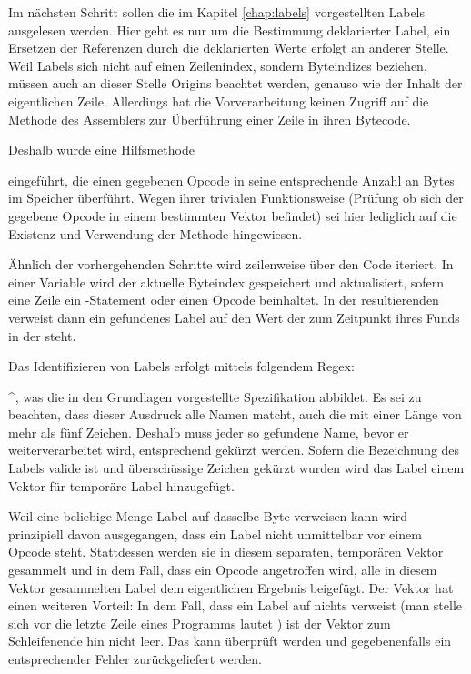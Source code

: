Im nächsten Schritt sollen die im Kapitel \ref{chap:labels} vorgestellten Labels ausgelesen werden. Hier geht es nur um die Bestimmung deklarierter Label, ein Ersetzen der Referenzen durch die deklarierten Werte erfolgt an anderer Stelle. Weil Labels sich nicht auf einen Zeilenindex, sondern Byteindizes beziehen, müssen auch an dieser Stelle Origins beachtet werden, genauso wie der Inhalt der eigentlichen Zeile. Allerdings hat die Vorverarbeitung keinen Zugriff auf die Methode  des Assemblers zur Überführung einer Zeile in ihren Bytecode. 

Deshalb wurde eine Hilfsmethode

 eingeführt, die einen gegebenen Opcode in seine entsprechende Anzahl an Bytes im Speicher überführt. Wegen ihrer trivialen Funktionsweise (Prüfung ob sich der gegebene Opcode in einem bestimmten Vektor befindet) sei hier lediglich auf die Existenz und Verwendung der Methode hingewiesen. 

Ähnlich der vorhergehenden Schritte wird zeilenweise über den Code iteriert. In einer Variable  wird der aktuelle Byteindex gespeichert und aktualisiert, sofern eine Zeile ein -Statement oder einen Opcode beinhaltet. In der resultierenden  verweist dann ein gefundenes Label auf den Wert der zum Zeitpunkt ihres Funds in der  steht.

Das Identifizieren von Labels erfolgt mittels folgendem Regex:

\textasciicircum\regex{( *[a-zA-Z@?][a-zA-Z@?0-9]*:)}, was die in den Grundlagen vorgestellte Spezifikation abbildet. Es sei zu beachten, dass dieser Ausdruck alle Namen matcht, auch die mit einer Länge von mehr als fünf Zeichen. Deshalb muss jeder so gefundene Name, bevor er weiterverarbeitet wird, entsprechend gekürzt werden. Sofern die Bezeichnung des Labels valide ist und überschüssige Zeichen gekürzt wurden wird das Label einem Vektor für \glqq temporäre\grqq{} Label hinzugefügt.

Weil eine beliebige Menge Label auf dasselbe Byte verweisen kann wird prinzipiell davon ausgegangen, dass ein Label nicht unmittelbar vor einem Opcode steht. Stattdessen werden sie in diesem separaten, \glqq temporären\grqq{} Vektor gesammelt und in dem Fall, dass ein Opcode angetroffen wird, alle in diesem Vektor gesammelten Label dem eigentlichen Ergebnis beigefügt. Der Vektor hat einen weiteren Vorteil: In dem Fall, dass ein Label auf nichts verweist (man stelle sich vor die letzte Zeile eines Programms lautet ) ist der Vektor zum Schleifenende hin nicht leer. Das kann überprüft werden und gegebenenfalls ein entsprechender Fehler zurückgeliefert werden.

